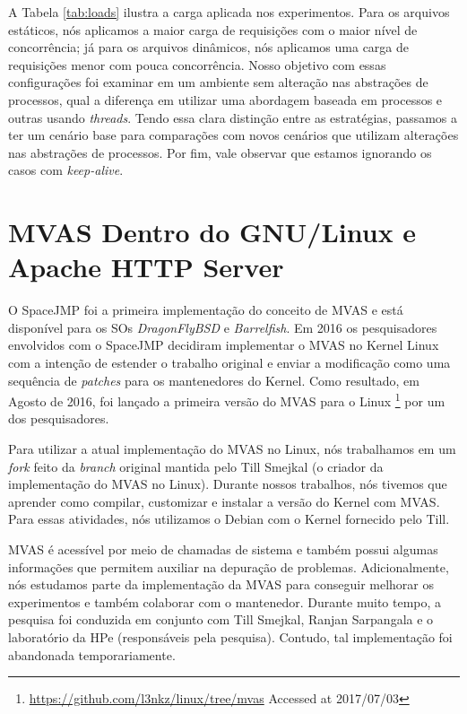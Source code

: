 

A Tabela \ref{tab:loads} ilustra a carga aplicada nos experimentos. Para os
arquivos estáticos, nós aplicamos a maior carga de requisições com o maior
nível de concorrência; já para os arquivos dinâmicos, nós aplicamos uma carga
de requisições menor com pouca concorrência. Nosso objetivo com essas
configurações foi examinar em um ambiente sem alteração nas abstrações de
processos, qual a diferença em utilizar uma abordagem baseada em processos e
outras usando \emph{threads}. Tendo essa clara distinção entre as estratégias,
passamos a ter um cenário base para comparações com novos cenários que utilizam
alterações nas abstrações de processos. Por fim, vale observar que estamos
ignorando os casos com \emph{keep-alive}.

\section{MVAS Dentro do GNU/Linux e Apache HTTP Server}
\label{sec:mvas_inside_httpd}

O SpaceJMP \citep{spacejmp} foi a primeira implementação do conceito de MVAS e
está disponível para os SOs \emph{DragonFlyBSD} e \emph{Barrelfish}. Em 2016 os pesquisadores
envolvidos com o SpaceJMP decidiram implementar o MVAS no Kernel Linux com a
intenção de estender o trabalho original e enviar a modificação como uma
sequência de \emph{patches} para os mantenedores do Kernel. Como resultado, em
Agosto de 2016, foi lançado a primeira versão do MVAS para o Linux
\footnote{\url{https://github.com/l3nkz/linux/tree/mvas} Accessed at 2017/07/03} por
um dos pesquisadores.
 
Para utilizar a atual implementação do MVAS no Linux, nós trabalhamos em um
\emph{fork} feito da \emph{branch} original mantida pelo Till Smejkal (o
criador da implementação do MVAS no Linux). Durante nossos trabalhos, nós
tivemos que aprender como compilar, customizar e instalar a versão do Kernel
com MVAS. Para essas atividades, nós utilizamos o Debian com o Kernel fornecido
pelo Till.

MVAS é acessível por meio de chamadas de sistema e também possui algumas
informações que permitem auxiliar na depuração de problemas. Adicionalmente,
nós estudamos parte da implementação da MVAS para conseguir melhorar os
experimentos e também colaborar com o mantenedor. Durante muito tempo, a
pesquisa foi conduzida em conjunto com Till Smejkal, Ranjan Sarpangala e o
laboratório da HPe (responsáveis pela pesquisa). Contudo, tal implementação foi
abandonada temporariamente.
 
